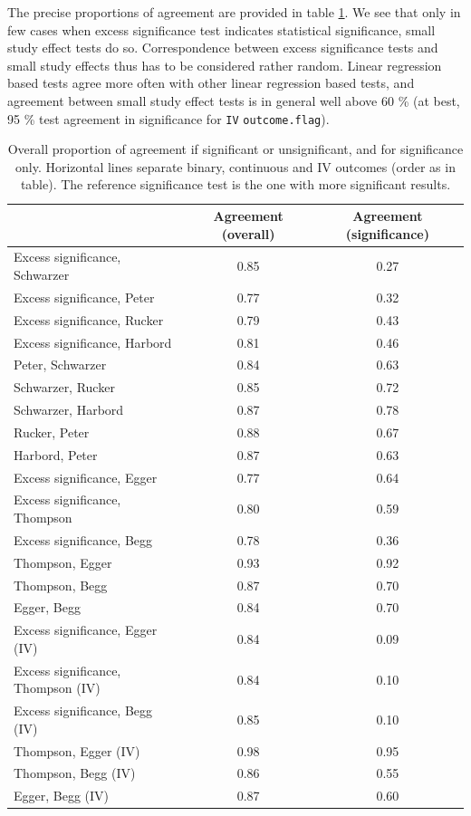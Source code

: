\documentclass[11pt,a4paper,twoside]{book}\usepackage[]{graphicx}\usepackage[]{color}
\begin{document}
The precise proportions of agreement are provided in table \ref{test.agreement}. We see that only in few cases when excess significance test indicates statistical significance, small study effect tests do so. Correspondence between excess significance tests and small study effects thus has to be considered rather random. Linear regression based tests agree more often with other linear regression based tests, and agreement between small study effect tests is in general well above 60 \% (at best, 95 \% test agreement in significance for \texttt{IV} \texttt{outcome.flag}).

\begin{table}[ht]
\centering
\begingroup\scriptsize
\begin{tabular}{lcc}
  \hline
 & Agreement (overall) & Agreement (significance) \\ 
  \hline
Excess significance, Schwarzer & 0.85 & 0.27 \\ 
  Excess significance, Peter & 0.77 & 0.32 \\ 
  Excess significance, Rucker & 0.79 & 0.43 \\ 
  Excess significance, Harbord & 0.81 & 0.46 \\ 
  Peter, Schwarzer & 0.84 & 0.63 \\ 
  Schwarzer, Rucker & 0.85 & 0.72 \\ 
  Schwarzer, Harbord & 0.87 & 0.78 \\ 
  Rucker, Peter & 0.88 & 0.67 \\ 
  Harbord, Peter & 0.87 & 0.63 \\ 
  Excess significance, Egger & 0.77 & 0.64 \\ 
  Excess significance, Thompson & 0.80 & 0.59 \\ 
  Excess significance, Begg & 0.78 & 0.36 \\ 
  Thompson, Egger & 0.93 & 0.92 \\ 
  Thompson, Begg & 0.87 & 0.70 \\ 
  Egger, Begg & 0.84 & 0.70 \\ 
  Excess significance, Egger (IV) & 0.84 & 0.09 \\ 
  Excess significance, Thompson (IV) & 0.84 & 0.10 \\ 
  Excess significance, Begg (IV) & 0.85 & 0.10 \\ 
  Thompson, Egger (IV) & 0.98 & 0.95 \\ 
  Thompson, Begg (IV) & 0.86 & 0.55 \\ 
  Egger, Begg (IV) & 0.87 & 0.60 \\ 
   \hline
\end{tabular}
\endgroup
\caption{Overall proportion of agreement if significant or unsignificant, and for significance only. Horizontal lines separate binary, continuous and IV outcomes (order as in table). The reference significance test is the one with more significant results.} 
\label{test.agreement}
\end{table}
\end{document}
